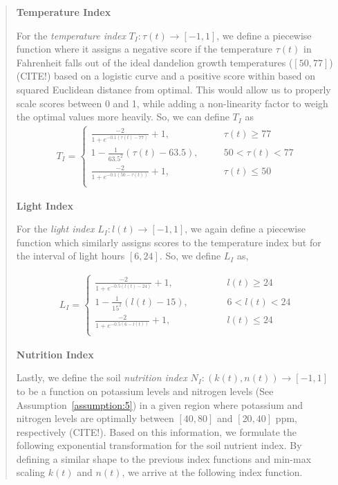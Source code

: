 \begin{quote}
\textbf{Temperature Index}

For the \textit{temperature index} \(T_I: \tau(t) \longrightarrow [-1, 1]\), we define a piecewise function where it assigns a negative score if the temperature \(\tau(t)\) in Fahrenheit falls out of the ideal dandelion growth temperatures (\([50,  77]\)) (CITE!) based on a logistic curve and a positive score within based on squared Euclidean distance from optimal. This would allow us to properly scale scores between 0 and 1, while adding a non-linearity factor to weigh the optimal values more heavily. So, we can define \(T_I\) as
\begin{align}
    T_I = 
    \begin{cases}
        \frac{-2}{1+e^{-0.1(\tau(t)-77)}} + 1, \hspace{2cm} & \tau(t) \geq 77 \\
        1 - \frac{1}{63.5^2} (\tau(t) - 63.5), & 50 < \tau(t) < 77 \\
        \frac{-2}{1+e^{-0.1(50-\tau(t))}} + 1, \hspace{2cm} & \tau(t) \leq 50\\
    \end{cases}
\end{align}


\textbf{Light Index}

For the \textit{light index} \(L_I: l(t) \longrightarrow [-1, 1]\), we again define a piecewise function which similarly assigns scores to the temperature index but for the interval of light hours \([6, 24]\). So, we define \(L_I\) as,

\begin{align}
    L_I = 
    \begin{cases}
        \frac{-2}{1+e^{-0.5(l(t)-24)}} + 1, \hspace{2cm} & l(t) \geq 24 \\
        1 - \frac{1}{15^2} (l(t) - 15), & 6 < l(t) < 24 \\
        \frac{-2}{1+e^{-0.5(6-l(t))}} + 1, \hspace{2cm} & l(t) \leq 24 \\
    \end{cases}
\end{align}

\textbf{Nutrition Index}

Lastly, we define the soil \textit{nutrition index} \(N_I: (k(t),n(t)) \longrightarrow [-1, 1]\) to be a function on potassium levels and nitrogen levels (See Assumption~\ref{assumption:5}) in a given region where potassium and nitrogen levels are optimally between \([40, 80]\) and \([20, 40]\) ppm, respectively (CITE!). Based on this information, we formulate the following exponential transformation for the soil nutrient index. By defining a similar shape to the previous index functions and min-max scaling \(k(t)\) and \(n(t)\), we arrive at the following index function.


\end{quote}
